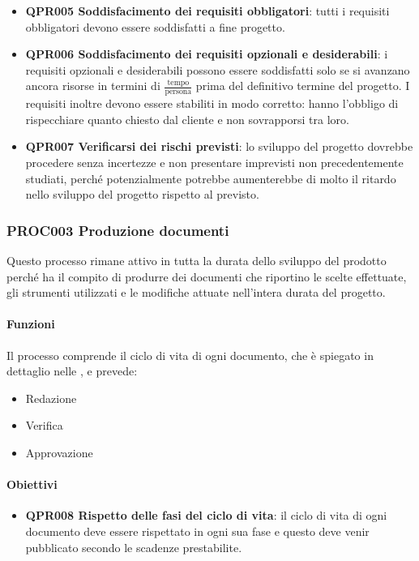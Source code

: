 		\begin{itemize}
			\item \textbf{QPR005 Soddisfacimento dei requisiti obbligatori}: tutti i requisiti obbligatori devono essere soddisfatti a fine progetto.
			\item \textbf{QPR006 Soddisfacimento dei requisiti opzionali e desiderabili}: i requisiti opzionali e desiderabili possono essere soddisfatti
				solo se si avanzano ancora risorse in termini di $ \frac{\text{tempo}}{\text{persona}}$ prima del definitivo termine del progetto. 
				I requisiti inoltre devono essere stabiliti in modo corretto: hanno l'obbligo di rispecchiare quanto chiesto dal cliente e non sovrapporsi tra loro.
			\item \textbf{QPR007 Verificarsi dei rischi previsti}: lo sviluppo del progetto dovrebbe procedere senza incertezze e non presentare imprevisti non precedentemente studiati, perché potenzialmente potrebbe aumenterebbe di molto il ritardo nello sviluppo del progetto rispetto al previsto.
		\end{itemize}
	
	\subsubsection{PROC003 Produzione documenti}
	Questo processo rimane attivo in tutta la durata dello sviluppo del prodotto perché ha il compito di produrre dei documenti che riportino le scelte effettuate, gli strumenti utilizzati e le modifiche attuate nell'intera durata del progetto.
	
		\paragraph*{Funzioni}
		Il processo comprende il ciclo di vita di ogni documento, che è spiegato in dettaglio nelle \NdP, e prevede:
		
		\begin{itemize}
			\item Redazione
			\item Verifica
			\item Approvazione
		\end{itemize}
	
		\paragraph*{Obiettivi}
		
		\begin{itemize}
			\item \textbf{QPR008 Rispetto delle fasi del ciclo di vita}: il ciclo di vita di ogni documento deve essere rispettato in ogni sua fase e questo deve venir pubblicato secondo le scadenze prestabilite. 
		\end{itemize}

